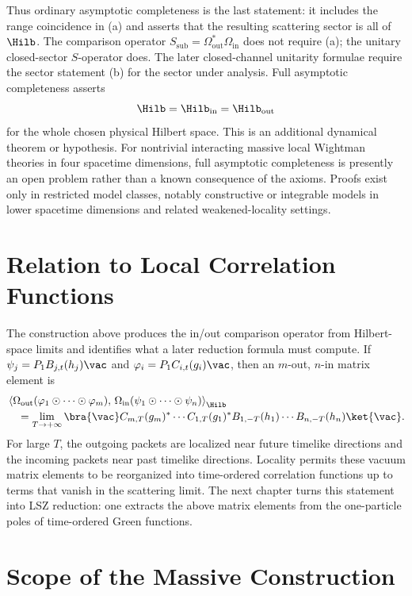 Thus ordinary asymptotic completeness is the last statement: it includes the
range coincidence in (a) and asserts that the resulting scattering sector is
all of \(\Hilb\).  The comparison operator
\(S_{\mathrm{sub}}=\Omega_{\mathrm{out}}^*\Omega_{\mathrm{in}}\) does not
require (a); the unitary closed-sector \(S\)-operator does.  The later
closed-channel unitarity formulae require the sector statement (b) for the
sector under analysis.  Full asymptotic
completeness asserts
\[
  \Hilb=\Hilb_{\mathrm{in}}=\Hilb_{\mathrm{out}}
\]
for the whole chosen physical Hilbert space.  This is an additional dynamical
theorem or hypothesis.  For nontrivial interacting massive local Wightman
theories in four spacetime dimensions, full asymptotic completeness is
presently an open problem rather than a known consequence of the axioms.
Proofs exist only in restricted model classes, notably constructive or
integrable models in lower spacetime dimensions and related weakened-locality
settings.

\section{Relation to Local Correlation Functions}

The construction above produces the in/out comparison operator from
Hilbert-space limits and identifies what a later reduction formula must
compute. If
\(\psi_j=P_1B_{j,t}(h_j)\vac\) and
\(\varphi_i=P_1C_{i,t}(g_i)\vac\), then an \(m\)-out, \(n\)-in matrix
element is
\[
\begin{aligned}
&\left\langle
  \Omega_{\mathrm{out}}
  (\varphi_1\odot\cdots\odot\varphi_m),\,
  \Omega_{\mathrm{in}}
  (\psi_1\odot\cdots\odot\psi_n)
  \right\rangle_{\Hilb}
\\
&\quad =
  \lim_{T\to+\infty}
  \bra{\vac}
  C_{m,T}(g_m)^*\cdots C_{1,T}(g_1)^*
  B_{1,-T}(h_1)\cdots B_{n,-T}(h_n)
  \ket{\vac}.
\end{aligned}
\]
For large \(T\), the outgoing packets are localized near future timelike
directions and the incoming packets near past timelike directions. Locality
permits these vacuum matrix elements to be reorganized into time-ordered
correlation functions up to terms that vanish in the scattering limit. The
next chapter turns this statement into LSZ reduction: one extracts the above
matrix elements from the one-particle poles of time-ordered Green functions.

\section{Scope of the Massive Construction}

